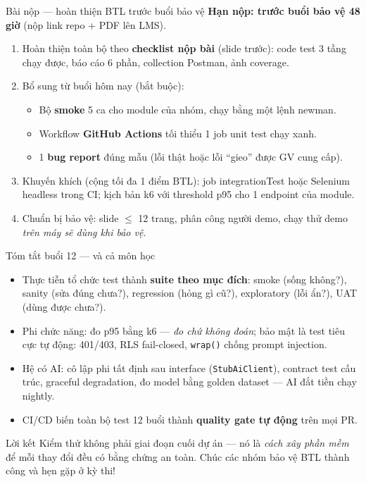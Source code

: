\documentclass[aspectratio=169,12pt]{beamer}
\begin{document}
\begin{frame}{Bài nộp --- hoàn thiện BTL trước buổi bảo vệ}
  \textbf{Hạn nộp: trước buổi bảo vệ 48 giờ} (nộp link repo + PDF lên LMS).
  \begin{enumerate}
    \item Hoàn thiện toàn bộ theo \textbf{checklist nộp bài} (slide trước): code test 3 tầng chạy được, báo cáo 6 phần, collection Postman, ảnh coverage.
    \item Bổ sung từ buổi hôm nay (bắt buộc):
      \begin{itemize}
        \item Bộ \textbf{smoke} 5 ca cho module của nhóm, chạy bằng một lệnh newman.
        \item Workflow \textbf{GitHub Actions} tối thiểu 1 job unit test chạy xanh.
        \item 1 \textbf{bug report} đúng mẫu (lỗi thật hoặc lỗi ``gieo'' được GV cung cấp).
      \end{itemize}
    \item Khuyến khích (cộng tối đa 1 điểm BTL): job integrationTest hoặc Selenium headless trong CI; kịch bản k6 với threshold p95 cho 1 endpoint của module.
    \item Chuẩn bị bảo vệ: slide $\leq$ 12 trang, phân công người demo, chạy thử demo \emph{trên máy sẽ dùng khi bảo vệ}.
  \end{enumerate}
\end{frame}

\begin{frame}{Tóm tắt buổi 12 --- và cả môn học}
  \vspace*{-0.4em}
  \begin{itemize}
    \item Thực tiễn tổ chức test thành \textbf{suite theo mục đích}: smoke (sống không?), sanity (sửa đúng chưa?), regression (hỏng gì cũ?), exploratory (lỗi ẩn?), UAT (dùng được chưa?).
    \item Phi chức năng: đo p95 bằng k6 --- \emph{đo chứ không đoán}; bảo mật là test tiêu cực tự động: 401/403, RLS fail-closed, \texttt{wrap()} chống prompt injection.
    \item Hệ có AI: cô lập phi tất định sau interface (\texttt{StubAiClient}), contract test cấu trúc, graceful degradation, đo model bằng golden dataset --- AI đắt tiền chạy nightly.
    \item CI/CD biến toàn bộ test 12 buổi thành \textbf{quality gate tự động} trên mọi PR.
  \end{itemize}
  \begin{block}{Lời kết}
    \small Kiểm thử không phải giai đoạn cuối dự án --- nó là \emph{cách xây
    phần mềm} để mỗi thay đổi đều có bằng chứng an toàn. Chúc các nhóm bảo vệ
    BTL thành công và hẹn gặp ở kỳ thi!
  \end{block}
\end{frame}
\end{document}
